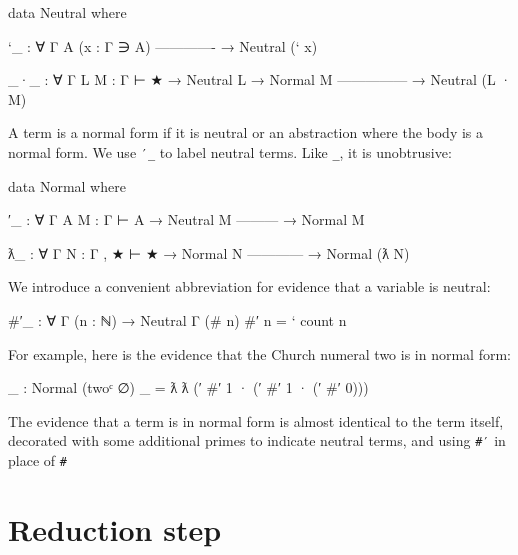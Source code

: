\begin{fence}
\begin{code}
data Neutral where

  `_  : ∀ {Γ A} (x : Γ ∋ A)
      -------------
    → Neutral (` x)

  _·_  : ∀ {Γ} {L M : Γ ⊢ ★}
    → Neutral L
    → Normal M
      ---------------
    → Neutral (L · M)
\end{code}
\end{fence}

A term is a normal form if it is neutral or an abstraction where the
body is a normal form. We use \texttt{′\_} to label neutral terms. Like
\texttt{\textasciigrave{}\_}, it is unobtrusive:

\begin{fence}
\begin{code}
data Normal where

  ′_ : ∀ {Γ A} {M : Γ ⊢ A}
    → Neutral M
      ---------
    → Normal M

  ƛ_  : ∀ {Γ} {N : Γ , ★ ⊢ ★}
    → Normal N
      ------------
    → Normal (ƛ N)
\end{code}
\end{fence}

We introduce a convenient abbreviation for evidence that a variable is
neutral:

\begin{fence}
\begin{code}
#′_ : ∀ {Γ} (n : ℕ) → Neutral {Γ} (# n)
#′ n  =  ` count n
\end{code}
\end{fence}

For example, here is the evidence that the Church numeral two is in
normal form:

\begin{fence}
\begin{code}
_ : Normal (twoᶜ {∅})
_ = ƛ ƛ (′ #′ 1 · (′ #′ 1 · (′ #′ 0)))
\end{code}
\end{fence}

The evidence that a term is in normal form is almost identical to the
term itself, decorated with some additional primes to indicate neutral
terms, and using \texttt{\#′} in place of \texttt{\#}

\hypertarget{reduction-step}{%
\section{Reduction step}\label{reduction-step}}

